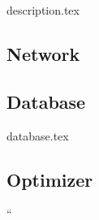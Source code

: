 {description.tex}

\subsection{Network} \label{sec:NN}
\newpage

\subsection{Database} \label{sec:DB}
{database.tex}

\subsection{Optimizer} \label{sec:opt}
``
